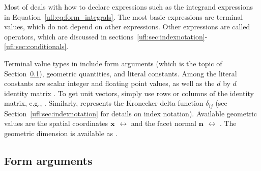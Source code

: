 Most of \ufl{} deals with how to declare expressions such as the
integrand expressions in Equation~\ref{ufl:eq:form_integrals}.  The
most basic expressions are terminal values, which do not depend on
other expressions.  Other expressions are called operators, which are
discussed in sections~\ref{ufl:sec:indexnotation}-\ref{ufl:sec:conditionals}.

Terminal value types in \ufl{} include form arguments (which is the
topic of Section~\ref{ufl:sec:arguments}), geometric quantities, and
literal constants.  Among the literal constants are scalar integer and
floating point values, as well as the $d$ by $d$ identity matrix
.  To get unit vectors, simply use rows or
columns of the identity matrix, e.g., .  Similarly,
 represents the Kronecker delta function $\delta_{ij}$ (see
Section~\ref{ufl:sec:indexnotation} for details on index notation).
Available geometric values are the spatial coordinates $\mathbf{x}$
$\leftrightarrow$  and the facet normal $\mathbf{n}$
$\leftrightarrow$ .  The geometric dimension is
available as .

\subsection{Form arguments} \label{ufl:sec:arguments}

